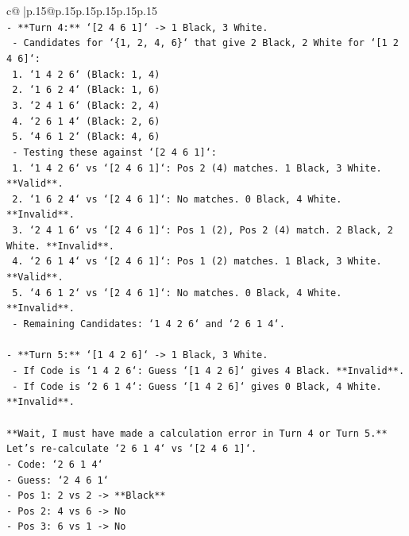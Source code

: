 \documentclass{article}
\begin{document}
{\begin{supertabular}{c@{$\;$}|p{.15\linewidth}@{}p{.15\linewidth}p{.15\linewidth}p{.15\linewidth}p{.15\linewidth}p{.15\linewidth}}
{{{\\ 
\texttt{{-} **Turn 4:** `{[}2 4 6 1{]}` {-}> 1 Black, 3 White.} \\
\texttt{  {-} Candidates for `\{1, 2, 4, 6\}` that give 2 Black, 2 White for `{[}1 2 4 6{]}`:} \\
\texttt{    1. `1 4 2 6` (Black: 1, 4)} \\
\texttt{    2. `1 6 2 4` (Black: 1, 6)} \\
\texttt{    3. `2 4 1 6` (Black: 2, 4)} \\
\texttt{    4. `2 6 1 4` (Black: 2, 6)} \\
\texttt{    5. `4 6 1 2` (Black: 4, 6)} \\
\texttt{  {-} Testing these against `{[}2 4 6 1{]}`:} \\
\texttt{    1. `1 4 2 6` vs `{[}2 4 6 1{]}`: Pos 2 (4) matches. 1 Black, 3 White. **Valid**.} \\
\texttt{    2. `1 6 2 4` vs `{[}2 4 6 1{]}`: No matches. 0 Black, 4 White. **Invalid**.} \\
\texttt{    3. `2 4 1 6` vs `{[}2 4 6 1{]}`: Pos 1 (2), Pos 2 (4) match. 2 Black, 2 White. **Invalid**.} \\
\texttt{    4. `2 6 1 4` vs `{[}2 4 6 1{]}`: Pos 1 (2) matches. 1 Black, 3 White. **Valid**.} \\
\texttt{    5. `4 6 1 2` vs `{[}2 4 6 1{]}`: No matches. 0 Black, 4 White. **Invalid**.} \\
\texttt{  {-} Remaining Candidates: `1 4 2 6` and `2 6 1 4`.} \\
\\ 
\texttt{{-} **Turn 5:** `{[}1 4 2 6{]}` {-}> 1 Black, 3 White.} \\
\texttt{  {-} If Code is `1 4 2 6`: Guess `{[}1 4 2 6{]}` gives 4 Black. **Invalid**.} \\
\texttt{  {-} If Code is `2 6 1 4`: Guess `{[}1 4 2 6{]}` gives 0 Black, 4 White. **Invalid**.} \\
\\ 
\texttt{**Wait, I must have made a calculation error in Turn 4 or Turn 5.**} \\
\texttt{Let's re{-}calculate `2 6 1 4` vs `{[}2 4 6 1{]}`.} \\
\texttt{{-} Code: `2 6 1 4`} \\
\texttt{{-} Guess: `2 4 6 1`} \\
\texttt{{-} Pos 1: 2 vs 2 {-}> **Black**} \\
\texttt{{-} Pos 2: 4 vs 6 {-}> No} \\
\texttt{{-} Pos 3: 6 vs 1 {-}> No} \\
}}}
\end{supertabular}}
\end{document}
